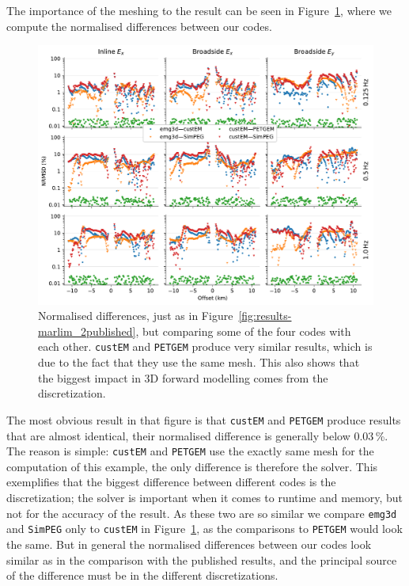 \documentclass[onecolumn,extra,camera]{gji}
\newcommand{\emg}[2]{\texttt{emg#1#2}\xspace}
\newcommand{\simpeg}{\texttt{SimPEG}\xspace}
\newcommand{\custem}{\texttt{custEM}\xspace}
\newcommand{\petgem}{\texttt{PETGEM}\xspace}
\begin{document}
The importance of the meshing to the result can be seen in Figure~\ref{fig:results-marlim_2ours}, where we compute the normalised differences between our codes.
%
\begin{figure}
  \centering
  \includegraphics[width=.9\linewidth]{figures/results-marlim_2ours}
  \caption{Normalised differences, just as in Figure~\ref{fig:results-marlim_2published}, but comparing some of the four codes with each other. \custem and \petgem produce very similar results, which is due to the fact that they use the same mesh. This also shows that the biggest impact in 3D forward modelling comes from the discretization.}
  \label{fig:results-marlim_2ours}
\end{figure}
%
The most obvious result in that figure is that \custem and \petgem produce results that are almost identical, their normalised difference is generally below 0.03\,\%. The reason is simple: \custem and \petgem use the exactly same mesh for the computation of this example, the only difference is therefore the solver. This exemplifies that the biggest difference between different codes is the discretization; the solver is important when it comes to runtime and memory, but not for the accuracy of the result. As these two are so similar we compare \emg3d and \simpeg only to \custem in Figure~\ref{fig:results-marlim_2ours}, as the comparisons to \petgem would look the same. But in general the normalised differences between our codes look similar as in the comparison with the published results, and the principal source of the difference must be in the different discretizations.
\end{document}
